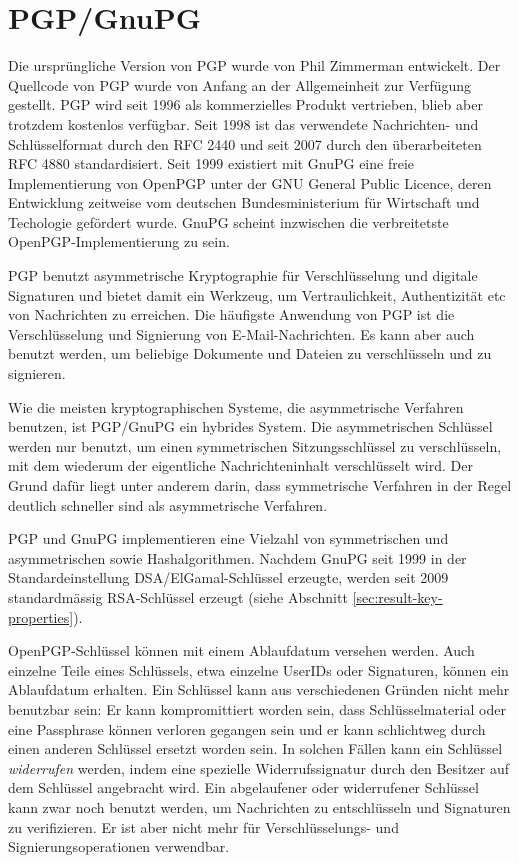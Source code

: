 \section{PGP/GnuPG}
\label{ch:Grundlagen:sec:PGP}

Die urspr\"ungliche Version von PGP wurde von Phil Zimmerman
entwickelt. Der Quellcode von PGP wurde von Anfang an der
Allgemeinheit zur Verf\"ugung gestellt. PGP wird seit 1996 als
kommerzielles Produkt vertrieben, blieb aber trotzdem kostenlos
verf\"ugbar\cite{wiki:pgp}. Seit 1998 ist das verwendete Nachrichten-
und Schl\"usselformat durch den RFC 2440\cite{Callas1998} und seit
2007 durch den \"uberarbeiteten RFC 4880\cite{Callas2007}
standardisiert. Seit 1999 existiert mit GnuPG\cite{Gnupg2010} eine
freie Implementierung von OpenPGP unter der GNU General Public
Licence, deren Entwicklung zeitweise vom deutschen Bundesministerium
f\"ur Wirtschaft und Techologie gef\"ordert wurde. GnuPG scheint
inzwischen die verbreitetste OpenPGP-Implementierung zu sein.

PGP benutzt asymmetrische Kryptographie f\"ur Verschl\"usselung und
digitale Signaturen und bietet damit ein Werkzeug, um Vertraulichkeit,
Authentizit\"at etc von Nachrichten zu erreichen. Die h\"aufigste
Anwendung von PGP ist die Verschl\"usselung und Signierung von
E-Mail-Nachrichten. Es kann aber auch benutzt werden, um beliebige
Dokumente und Dateien zu verschl\"usseln und zu signieren.

Wie die meisten kryptographischen Systeme, die asymmetrische Verfahren
benutzen, ist PGP/GnuPG ein hybrides System. Die asymmetrischen
Schl\"ussel werden nur benutzt, um einen symmetrischen
Sitzungsschl\"ussel zu verschl\"usseln, mit dem wiederum der
eigentliche Nachrichteninhalt verschl\"usselt wird. Der Grund daf\"ur
liegt unter anderem darin, dass symmetrische Verfahren in der Regel
deutlich schneller sind als asymmetrische Verfahren.

PGP und GnuPG implementieren eine Vielzahl von symmetrischen und
asymmetrischen sowie Hashalgorithmen. Nachdem GnuPG seit 1999 in der
Standardeinstellung DSA/ElGamal-Schl\"ussel erzeugte, werden seit 2009
standardm\"assig RSA-Schl\"ussel erzeugt (siehe Abschnitt
\ref{sec:result-key-properties}).

OpenPGP-Schl\"ussel k\"onnen mit einem Ablaufdatum versehen
werden. Auch einzelne Teile eines Schl\"ussels, etwa einzelne UserIDs
oder Signaturen, k\"onnen ein Ablaufdatum erhalten. Ein Schl\"ussel
kann aus verschiedenen Gr\"unden nicht mehr benutzbar sein: Er kann
kompromittiert worden sein, dass Schl\"usselmaterial oder eine
Passphrase k\"onnen verloren gegangen sein und er kann schlichtweg
durch einen anderen Schl\"ussel ersetzt worden sein. In solchen
F\"allen kann ein Schl\"ussel \emph{widerrufen} werden, indem eine
spezielle Widerrufssignatur durch den Besitzer auf dem Schl\"ussel
angebracht wird. Ein abgelaufener oder widerrufener Schl\"ussel kann
zwar noch benutzt werden, um Nachrichten zu entschl\"usseln und
Signaturen zu verifizieren. Er ist aber nicht mehr f\"ur
Verschl\"usselungs- und Signierungsoperationen verwendbar.

